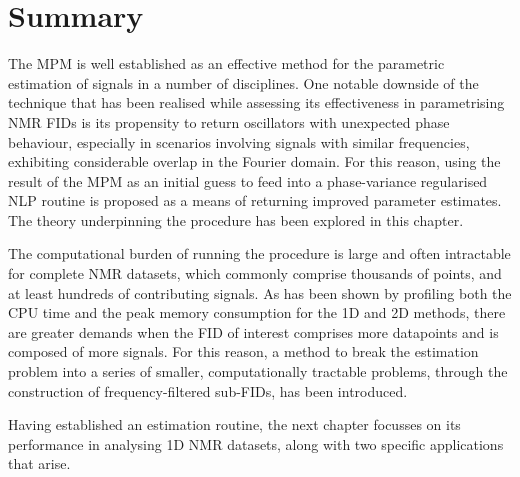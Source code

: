 \section{Summary}
The \ac{MPM} is well established as an effective method for the parametric
estimation of signals in a number of disciplines.
One notable downside of the technique that has been realised while assessing
its effectiveness in parametrising \ac{NMR} \acp{FID} is its propensity to
return oscillators with unexpected phase behaviour, especially in scenarios
involving signals with similar frequencies, exhibiting considerable overlap in
the Fourier domain.
For this reason, using the result of the \ac{MPM} as an initial guess to feed
into a phase-variance regularised \ac{NLP} routine is proposed as a means of
returning improved parameter estimates. The theory underpinning the procedure
has been explored in this chapter.

The computational burden of running the procedure is large and often
intractable for complete \ac{NMR} datasets, which commonly comprise thousands of
points, and at least hundreds of contributing signals. As has been shown by
profiling both the \ac{CPU} time and the peak memory consumption for the
\ac{1D} and \ac{2D} methods, there are greater demands when the \ac{FID} of
interest comprises more datapoints and is composed of more signals.
For this reason, a method to break the estimation problem into a
series of smaller, computationally tractable problems, through the construction
of frequency-filtered sub-\acp{FID}, has been introduced.

Having established an estimation routine, the next chapter focusses on its
performance in analysing \ac{1D} \ac{NMR} datasets, along with two specific
applications that arise.


